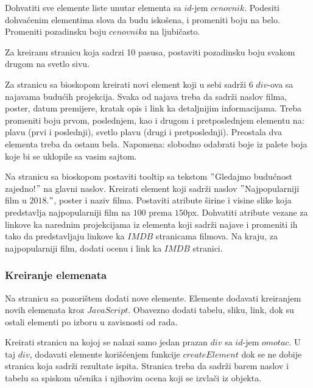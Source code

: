 \begin{primer}
Dohvatiti sve elemente liste unutar elementa sa $id$-jem $cenovnik$. Podesiti dohvaćenim elementima slova da budu iskošena, i promeniti boju na belo. Promeniti pozadinsku boju $cenovnika$ na ljubičasto.
\end{primer}

\begin{primer}
Za kreiranu stranicu koja sadrzi 10 pasusa, postaviti pozadinsku boju svakom drugom na svetlo sivu.
\end{primer}

\begin{primer}
Za stranicu sa bioskopom kreirati novi element koji u sebi sadrži 6 $div$-ova sa najavama budućih projekcija. Svaka od najava treba da sadrži naslov filma, poster, datum premijere, kratak opis i link ka detaljnijim informacijama. Treba promeniti boju prvom, poslednjem, kao i drugom i pretposlednjem elementu na: plavu (prvi i poslednji), svetlo plavu (drugi i pretposlednji). Preostala dva elementa treba da ostanu bela. Napomena: slobodno odabrati boje iz palete boja koje bi se uklopile sa vasim sajtom.   
\end{primer}

\begin{primer}
Na stranicu sa bioskopom postaviti tooltip sa tekstom $"$Gledajmo budućnost zajedno!$"$ na glavni naslov. Kreirati element koji sadrži naslov $"$Najpopularniji film u $2018$.$"$, poster i naziv filma. Postaviti atribute širine i visine slike koja predstavlja najpopularniji film na $100$ prema $150$px. Dohvatiti atribute vezane za linkove ka narednim projekcijama iz elementa koji sadrži najave i promeniti ih tako da predstavljaju linkove ka $IMDB$ stranicama filmova. Na kraju, za najpopularniji film, dodati ocenu i link ka $IMDB$ stranici.  
\end{primer}

\subsubsection{Kreiranje elemenata}
\begin{primer}
Na stranicu sa pozorištem dodati nove elemente. Elemente dodavati kreiranjem novih elemenata kroz $JavaScript$. Obavezno dodati tabelu, sliku, link, dok su ostali elementi po izboru u zavisnosti od rada.
\end{primer}

\begin{primer}
Kreirati stranicu na kojoj se nalazi samo jedan prazan $div$ sa $id$-jem $omotac$. U taj $div$, dodavati elemente korišćenjem funkcije $createElement$ dok se ne dobije stranica koja sadrži rezultate ispita. Stranica treba da sadrži barem naslov i tabelu sa spiskom učenika i njihovim ocena koji se izvlači iz objekta.
\end{primer}

